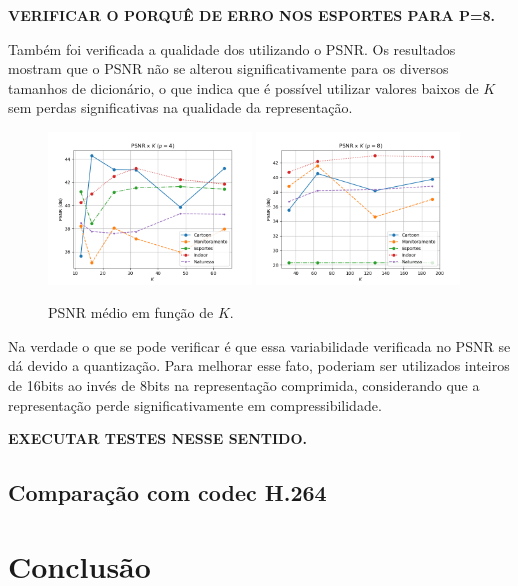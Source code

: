 \documentclass[cic,tc]{iiufrgs}
\begin{document}
\textbf{VERIFICAR O PORQUÊ DE ERRO NOS ESPORTES PARA P=8.}

Também foi verificada a qualidade dos utilizando o PSNR. 
Os resultados mostram que o PSNR não se alterou significativamente para os diversos tamanhos
de dicionário, o que indica que é possível utilizar valores baixos de $K$ sem perdas significativas
na qualidade da representação.

\begin{figure}[H]
    \caption{PSNR médio em função de $K$.}
    \begin{center}
        \includegraphics[width=0.48\textwidth]{img/graficos/p4_ds_psnr.png}
        \includegraphics[width=0.48\textwidth]{img/graficos/p8_ds_psnr.png}
    \end{center}
    \label{fig:psnr8bit}
\end{figure}

Na verdade o que se pode verificar é que essa variabilidade verificada no PSNR se dá devido 
a quantização.
Para melhorar esse fato, poderiam ser utilizados inteiros de 16bits ao invés de 8bits na 
representação comprimida, considerando que a representação perde significativamente em 
compressibilidade.

\textbf{EXECUTAR TESTES NESSE SENTIDO.}

\section{Comparação com codec H.264}

\chapter{Conclusão}


% 



\end{document}
